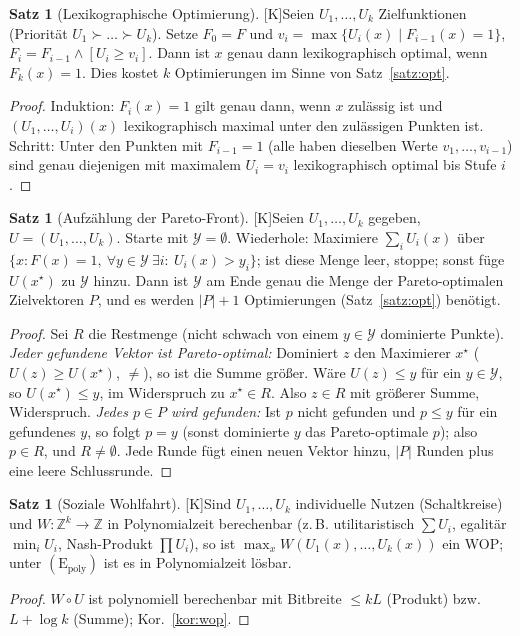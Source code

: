 \documentclass[a4paper,12pt]{article}
\theoremstyle{definition}
\newtheorem{satz}[definition]{Satz}
\newcommand{\tK}{\textsf{\small[K]}}   %
\newcommand{\ZZ}{\mathbb{Z}}
\newcommand{\Epoly}{(\mathrm{E}_{\mathrm{poly}})}
\begin{document}
\begin{satz}[Lexikographische Optimierung]\tK\label{satz:lex}
Seien \(U_1,\dots,U_k\) Zielfunktionen (Priorität \(U_1\succ\dots\succ U_k\)). Setze \(F_0=F\) und \(v_i=\max\{U_i(x)\mid F_{i-1}(x)=1\}\), \(F_i=F_{i-1}\wedge[U_i\ge v_i]\). Dann ist \(x\) genau dann lexikographisch optimal, wenn \(F_k(x)=1\). Dies kostet \(k\) Optimierungen im Sinne von Satz~\ref{satz:opt}.
\end{satz}
\begin{proof}
Induktion: \(F_i(x)=1\) gilt genau dann, wenn \(x\) zulässig ist und \((U_1,\dots,U_i)(x)\) lexikographisch maximal unter den zulässigen Punkten ist. Schritt: Unter den Punkten mit \(F_{i-1}=1\) (alle haben dieselben Werte \(v_1,\dots,v_{i-1}\)) sind genau diejenigen mit maximalem \(U_i=v_i\) lexikographisch optimal bis Stufe \(i\).
\end{proof}

\begin{satz}[Aufzählung der Pareto-Front]\tK\label{satz:pareto}
Seien \(U_1,\dots,U_k\) gegeben, \(U=(U_1,\dots,U_k)\). Starte mit \(\mathcal Y=\emptyset\). Wiederhole: Maximiere \(\sum_iU_i(x)\) über \(\{x: F(x)=1,\ \forall y\in\mathcal Y\ \exists i:\ U_i(x)>y_i\}\); ist diese Menge leer, stoppe; sonst füge \(U(x^\star)\) zu \(\mathcal Y\) hinzu. Dann ist \(\mathcal Y\) am Ende genau die Menge der Pareto-optimalen Zielvektoren \(P\), und es werden \(|P|+1\) Optimierungen (Satz~\ref{satz:opt}) benötigt.
\end{satz}
\begin{proof}
Sei \(R\) die Restmenge (nicht schwach von einem \(y\in\mathcal Y\) dominierte Punkte). \emph{Jeder gefundene Vektor ist Pareto-optimal:} Dominiert \(z\) den Maximierer \(x^\star\) (\(U(z)\ge U(x^\star)\), \(\ne\)), so ist die Summe größer. Wäre \(U(z)\le y\) für ein \(y\in\mathcal Y\), so \(U(x^\star)\le y\), im Widerspruch zu \(x^\star\in R\). Also \(z\in R\) mit größerer Summe, Widerspruch. \emph{Jedes \(p\in P\) wird gefunden:} Ist \(p\) nicht gefunden und \(p\le y\) für ein gefundenes \(y\), so folgt \(p=y\) (sonst dominierte \(y\) das Pareto-optimale \(p\)); also \(p\in R\), und \(R\neq\emptyset\). Jede Runde fügt einen neuen Vektor hinzu, \(|P|\) Runden plus eine leere Schlussrunde.
\end{proof}

\begin{satz}[Soziale Wohlfahrt]\tK\label{satz:swf}
Sind \(U_1,\dots,U_k\) individuelle Nutzen (Schaltkreise) und \(W:\ZZ^k\to\ZZ\) in Polynomialzeit berechenbar (z.\,B. utilitaristisch \(\sum U_i\), egalitär \(\min_i U_i\), Nash-Produkt \(\prod U_i\)), so ist \(\max_x W(U_1(x),\dots,U_k(x))\) ein WOP; unter \(\Epoly\) ist es in Polynomialzeit lösbar.
\end{satz}
\begin{proof}
\(W\circ U\) ist polynomiell berechenbar mit Bitbreite \(\le kL\) (Produkt) bzw. \(L+\log k\) (Summe); Kor.~\ref{kor:wop}.
\end{proof}
\end{document}
